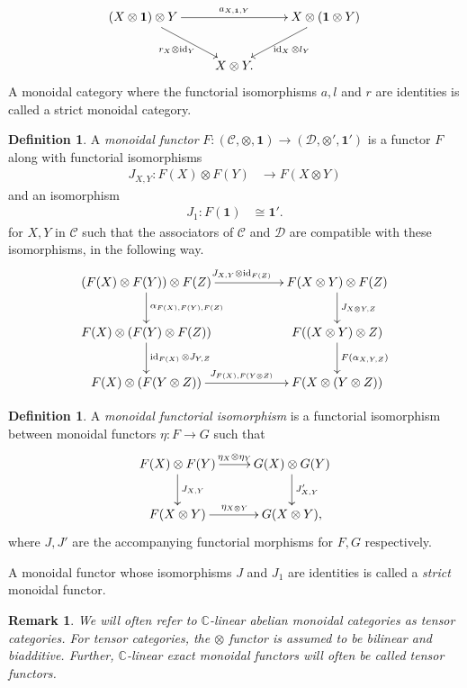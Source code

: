 \documentclass[a4paper, 10pt]{book}
\newtheorem{Rem}[theorem]{Remark}
\theoremstyle{definition}
\newtheorem{Def}[theorem]{Definition}
\numberwithin{equation}{chapter}
\newcommand\id{\operatorname{id}}
\newcommand\ot{\otimes}
\newcommand\kk{\mathbb C}
\newcommand\C{\mathcal C}
\newcommand\D{\mathcal D}
\newcommand{\ra}\rightarrow
\newcommand\one{\mathbf{1}}
\begin{document}
\begin{equation*}
\xymatrix{
(X \otimes \one) \otimes Y \ar[rr]^{a_{X,\textbf{1},Y}} \ar[dr]_{r_X \otimes \id_Y} && X \otimes(\one \otimes Y)\ar[dl]^{\id_X \otimes l_Y} \\ 
& X\otimes Y .
}
\end{equation*} 
A monoidal category where the functorial isomorphisms $a, l$ and $r$ are identities is called a strict monoidal category.
\begin{Def}
A \textit{monoidal functor} $F:(\C, \ot, \one)\rightarrow (\D, \otimes', \one')$ is a functor $F$ along with functorial isomorphisms \begin{align}
	J_{X, Y}: F(X) \otimes F(Y) &\rightarrow F(X\otimes Y)
	\end{align}
	and an isomorphism
	\begin{align}
	J_1: F(\one) &\cong \one'.
\end{align} 
for $ X, Y$ in $\C$ such that the associators of $\C$ and $\D$ are compatible with these isomorphisms, in the following way.
\[
\xymatrix{
(F(X)\ot F(Y)) \ot F(Z) \ar[rr]^{J_{X, Y}\otimes \id_{F(Z)}} \ar[d]^{\alpha_{F(X), F(Y), F(Z)}} & & F(X\ot Y)\ot F(Z) \ar[d]^{J_{X\otimes Y, Z}} \\
F(X)\ot (F(Y)\ot F(Z))\ar[d]^{\id_{F(X)}\ot J_{Y, Z}}	& & F((X\ot Y)\ot Z)\ar[d]^{F(\alpha_{X, Y, Z})} \\
F(X)\ot (F(Y\ot Z))  \ar[rr]^{J_{F(X), F(Y\otimes Z)}}& & F(X\ot (Y\ot Z))\\
}
\]

\end{Def}
 \begin{Def}
 A \textit{monoidal functorial isomorphism} is a functorial isomorphism between monoidal functors $\eta: F \ra G$ such that \[
\xymatrix { F(X)\ot F(Y) \ar[d]^{J_{X, Y}}\ar[r]^{\eta_X\ot\eta_Y} & G(X) \ot G(Y)\ar[d]^{J'_{X, Y}}\\
F(X\ot Y) \ar[r]^{\eta_{X\ot Y}} & G(X\ot Y),}
 \]
 where $J, J'$ are the accompanying functorial morphisms for $F, G$ respectively.
 \end{Def}
A monoidal functor whose isomorphisms $J$ and $J_1$ are identities is called a \textit{strict} monoidal functor.
\begin{Rem}\rm
We will often refer to $\kk$-linear abelian monoidal categories as \textit{tensor categories}. For tensor categories, the $\otimes$ functor is assumed to be bilinear and biadditive. Further, $\kk$-linear exact monoidal functors will often be called \textit{tensor functors}.
\end{Rem}
\end{document}

